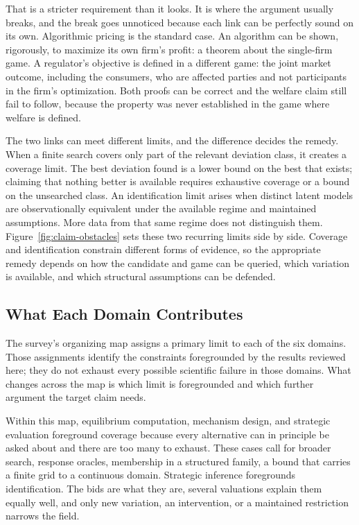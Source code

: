 That is a stricter requirement than it looks. It is where the argument usually
breaks, and the break goes unnoticed because each link can be perfectly sound
on its own.
Algorithmic pricing is the standard case. An algorithm can be shown, rigorously,
to maximize its own firm's profit: a theorem about the single-firm game. A
regulator's objective is defined in a different game: the joint market outcome, including
the consumers, who are affected parties and not participants
in the firm's optimization. Both proofs can be correct and the welfare claim
still fail to follow, because the property was never established in the game
where welfare is defined.

The two links can meet different limits, and the difference decides the remedy.
When a finite search covers only part of the relevant deviation class, it creates a
coverage limit. The best deviation found is a lower bound on the best that exists;
claiming that nothing better is available requires exhaustive coverage or a bound on
the unsearched class. An identification limit arises when distinct latent models are
observationally equivalent under the available regime and maintained assumptions.
More data from that same regime does not distinguish them.
Figure~\ref{fig:claim-obstacles} sets these two recurring limits side by side. Coverage and
identification constrain different forms of evidence, so the
appropriate remedy depends on how the candidate and game can be queried, which
variation is available, and which structural assumptions can be defended.

\subsection{What Each Domain Contributes}
\label{sec:synthesis:map}

The survey's organizing map assigns a primary limit to each of the six domains.
Those assignments identify the constraints foregrounded by the results reviewed here; they do not
exhaust every possible scientific failure in those domains. What changes across the
map is which limit is foregrounded and which further argument the target claim needs.

Within this map, equilibrium computation, mechanism design, and strategic evaluation
foreground coverage because every alternative can in principle be asked about and
there are too many to exhaust. These cases call for broader search, response
oracles, membership in a structured family, a bound that carries a finite grid
to a continuous domain. Strategic inference foregrounds identification. The bids are
what they are, several valuations explain them equally well, and only new
variation, an intervention, or a maintained restriction narrows the field.

